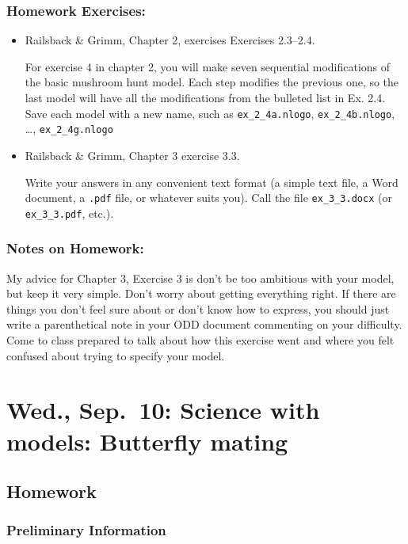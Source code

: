 \documentclass[
]{article}
\begin{document}
\subsubsection{Homework Exercises:}\label{homework-exercises-3}

\begin{itemize}
\item
  Railsback \& Grimm, Chapter 2, exercises Exercises 2.3--2.4.

  For exercise 4 in chapter 2, you will make seven sequential
  modifications of the basic mushroom hunt model. Each step modifies the
  previous one, so the last model will have all the modifications from
  the bulleted list in Ex. 2.4. Save each model with a new name, such as
  \texttt{ex\_2\_4a.nlogo}, \texttt{ex\_2\_4b.nlogo}, \dots,
  \texttt{ex\_2\_4g.nlogo}
\item
  Railsback \& Grimm, Chapter 3 exercise 3.3.

  Write your answers in any convenient text format (a simple text file,
  a Word document, a \texttt{.pdf} file, or whatever suits you). Call
  the file \texttt{ex\_3\_3.docx} (or \texttt{ex\_3\_3.pdf}, etc.).
\end{itemize}

\subsubsection{Notes on Homework:}\label{notes-on-homework-1}

My advice for Chapter 3, Exercise 3 is don't be too ambitious with your
model, but keep it very simple. Don't worry about getting everything
right. If there are things you don't feel sure about or don't know how
to express, you should just write a parenthetical note in your ODD
document commenting on your difficulty. Come to class prepared to talk
about how this exercise went and where you felt confused about trying to
specify your model.

\section{Wed., Sep.~10: Science with models: Butterfly
mating}\label{wed.-sep.-10-science-with-models-butterfly-mating}

\subsection{Homework}\label{homework-4}

\subsubsection{Preliminary Information}\label{preliminary-information-3}
\end{document}
